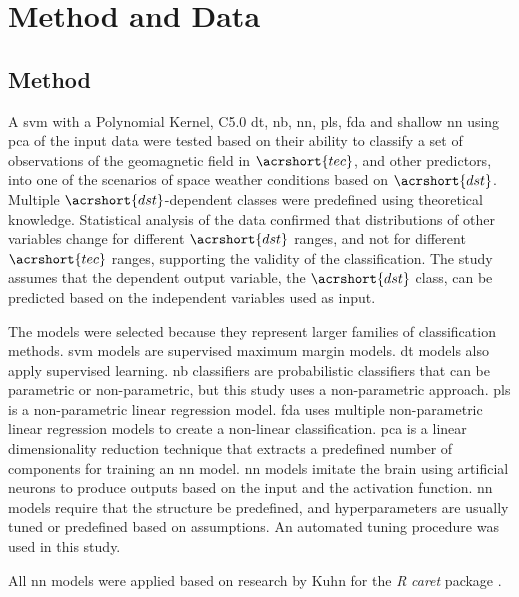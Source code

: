 \documentclass[sn-mathphys-num]{sn-jnl}%
\begin{document}
\section{Method and Data}
\label{sec:Dataset}

\subsection{Method}

A \acrfull{svm} with a Polynomial Kernel, C5.0 \acrfull{dt}, \acrfull{nb}, \acrfull{nn}, \acrfull{pls}, \acrfull{fda} and shallow \acrfull{nn} using \acrfull{pca} of the input data were tested based on their ability to classify a set of observations of the geomagnetic field in $\acrshort{tec}$, and other predictors, into one of the scenarios of space weather conditions based on $\acrshort{dst}$. Multiple $\acrshort{dst}$-dependent classes were predefined using theoretical knowledge. Statistical analysis of the data confirmed that distributions of other variables change for different $\acrshort{dst}$ ranges, and not for different $\acrshort{tec}$ ranges, supporting the validity of the classification. The study assumes that the dependent output variable, the $\acrshort{dst}$ class, can be predicted based on the independent variables used as input.

The models were selected because they represent larger families of classification methods. \acrshort{svm} models are supervised maximum margin models. \acrshort{dt} models also apply supervised learning. \acrshort{nb} classifiers are probabilistic classifiers that can be parametric or non-parametric, but this study uses a non-parametric approach. \acrshort{pls} is a non-parametric linear regression model. \acrshort{fda} uses multiple non-parametric linear regression models to create a non-linear classification. \acrshort{pca} is a linear dimensionality reduction technique that extracts a predefined number of components for training an \acrshort{nn} model. \acrshort{nn} models imitate the brain using artificial neurons to produce outputs based on the input and the activation function. \acrshort{nn} models require that the structure be predefined, and hyperparameters are usually tuned or predefined based on assumptions. An automated tuning procedure was used in this study.

All \acrshort{nn} models were applied based on research by Kuhn for the \textit{R} \textit{caret} package \cite{kuhn2013applied, KuhnCaret2024, rprojectProjectStatistical}.
\end{document}
